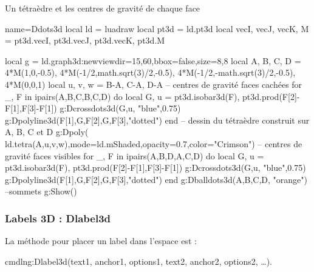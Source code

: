 \begin{demo}{Un tétraèdre et les centres de gravité de chaque face}
\begin{luadraw}{name=Ddots3d}
local ld = luadraw
local pt3d = ld.pt3d
local vecI, vecJ, vecK, M = pt3d.vecI, pt3d.vecJ, pt3d.vecK, pt3d.M

local g = ld.graph3d:new{viewdir={15,60},bbox=false,size={8,8}}
local A, B, C, D = 4*M(1,0,-0.5), 4*M(-1/2,math.sqrt(3)/2,-0.5), 4*M(-1/2,-math.sqrt(3)/2,-0.5), 4*M(0,0,1)
local u, v, w = B-A, C-A, D-A
-- centres de gravité faces cachées
for _, F in ipairs({{A,B,C},{B,C,D}}) do
local G, u = pt3d.isobar3d(F), pt3d.prod(F[2]-F[1],F[3]-F[1])
g:Dcrossdots3d({G,u}, "blue",0.75)
g:Dpolyline3d({{F[1],G,F[2]},{G,F[3]}},"dotted")
end
-- dessin du tétraèdre construit sur A, B, C et D
g:Dpoly( ld.tetra(A,u,v,w),{mode=ld.mShaded,opacity=0.7,color="Crimson"})
-- centres de gravité faces visibles
for _, F in ipairs({{A,B,D},{A,C,D}}) do
    local G, u = pt3d.isobar3d(F), pt3d.prod(F[2]-F[1],F[3]-F[1])
    g:Dcrossdots3d({G,u}, "blue",0.75)
    g:Dpolyline3d({{F[1],G,F[2]},{G,F[3]}},"dotted")
end
g:Dballdots3d({A,B,C,D}, "orange") --sommets
g:Show()
\end{luadraw}
\end{demo}

\subsubsection{Labels 3D : Dlabel3d}

La méthode pour placer un label dans l'espace est :

cmdln{g:Dlabel3d(text1, anchor1, options1, text2, anchor2, options2, \ldots).}

